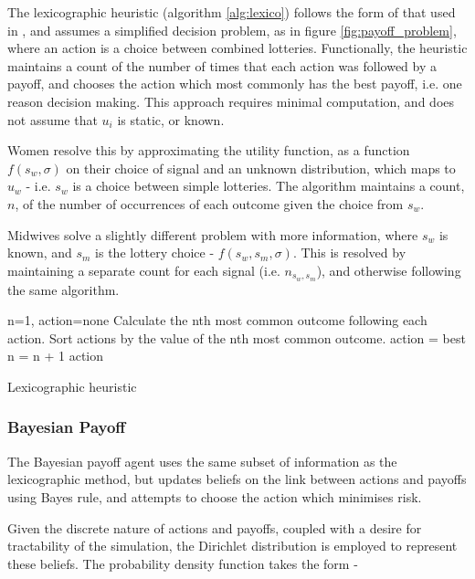 The lexicographic heuristic (algorithm \ref{alg:lexico}) follows the form of that used in \cite{Hau2008}, and assumes a simplified decision problem, as in figure \ref{fig:payoff_problem}, where an action is a choice between combined lotteries. Functionally, the heuristic maintains a count of the number of times that each action was followed by a payoff, and chooses the action which most commonly has the best payoff, i.e. one reason decision making. This approach requires minimal computation, and does not assume that \(u_{i}\) is static, or known.

Women resolve this by approximating the utility function, as a function \(f(s_{w}, \sigma)\) on their choice of signal and an unknown distribution, which maps to \(u_{w}\) - i.e. \(s_{w}\) is a choice between simple lotteries. The algorithm maintains a count, \(n\), of the number of occurrences of each outcome given the choice from \(s_{w}\).

Midwives solve a slightly different problem with more information, where \(s_{w}\) is known, and \(s_{m}\) is the lottery choice - \(f(s_{w}, s_{m},\sigma)\). This is resolved by maintaining a separate count for each signal (i.e. \(n_{s_{w},s_{m}}\)), and otherwise following the same algorithm.

\begin{algorithm}
\begin{algorithmic}
\State n=1, action=none
\State Calculate the nth most common outcome following each action.
\State Sort actions by the value of the nth most common outcome.
 \State action = best \EndIf
\State n = n + 1
\EndWhile
\State \Return action
\end{algorithmic}
\caption{Lexicographic heuristic\label{alg:lexico}}
\end{algorithm}

\subsubsection{Bayesian Payoff}

The Bayesian payoff agent uses the same subset of information as the lexicographic method, but updates beliefs on the link between actions and payoffs using Bayes rule, and attempts to choose the action which minimises risk.

Given the discrete nature of actions and payoffs, coupled with a desire for tractability of the
simulation, the Dirichlet distribution is employed to represent these beliefs. The probability
density function takes the form -

